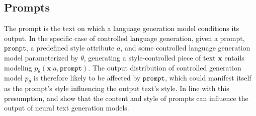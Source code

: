 
\subsection{Prompts}




The prompt is the text on which a language generation model conditions its output. In the specific case of controlled language generation, given a prompt, $\texttt{prompt}$, a predefined style attribute $a$, and some controlled language generation model parameterized by $\theta$, generating a style-controlled piece of text $\textbf{x}$ entails modeling $p_{\theta}(\textbf{x} | a, \texttt{prompt})$. The output distribution of controlled generation model $p_{\theta}$ is therefore likely to be affected by $\texttt{prompt}$, which could manifest itself as the prompt's style influencing the output text's style. In line with this presumption, \cite{fan-etal-2018-hierarchical} and \cite{lester2021power} show that the content and style of prompts can influence the output of neural text generation models. 

